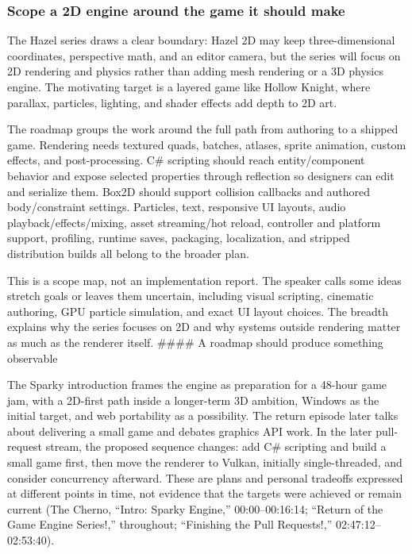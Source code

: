 \subsubsection{Scope a 2D engine around the game it should make}\label{06-engine-ii-ch041-scope-a-2d-engine-around-the-game-it-should-make}

The Hazel series draws a clear boundary: Hazel 2D may keep three-dimensional coordinates, perspective math, and an editor camera, but the series will focus on 2D rendering and physics rather than adding mesh rendering or a 3D physics engine. The motivating target is a layered game like Hollow Knight, where parallax, particles, lighting, and shader effects add depth to 2D art.

The roadmap groups the work around the full path from authoring to a shipped game. Rendering needs textured quads, batches, atlases, sprite animation, custom effects, and post-processing. C\# scripting should reach entity/component behavior and expose selected properties through reflection so designers can edit and serialize them. Box2D should support collision callbacks and authored body/constraint settings. Particles, text, responsive UI layouts, audio playback/effects/mixing, asset streaming/hot reload, controller and platform support, profiling, runtime saves, packaging, localization, and stripped distribution builds all belong to the broader plan.

This is a scope map, not an implementation report. The speaker calls some ideas stretch goals or leaves them uncertain, including visual scripting, cinematic authoring, GPU particle simulation, and exact UI layout choices. The breadth explains why the series focuses on 2D and why systems outside rendering matter as much as the renderer itself. \#\#\#\# A roadmap should produce something observable

The Sparky introduction frames the engine as preparation for a 48-hour game jam, with a 2D-first path inside a longer-term 3D ambition, Windows as the initial target, and web portability as a possibility. The return episode later talks about delivering a small game and debates graphics API work. In the later pull-request stream, the proposed sequence changes: add C\# scripting and build a small game first, then move the renderer to Vulkan, initially single-threaded, and consider concurrency afterward. These are plans and personal tradeoffs expressed at different points in time, not evidence that the targets were achieved or remain current (The Cherno, ``Intro: Sparky Engine,'' 00:00--00:16:14; ``Return of the Game Engine Series!,'' throughout; ``Finishing the Pull Requests!,'' 02:47:12--02:53:40).

